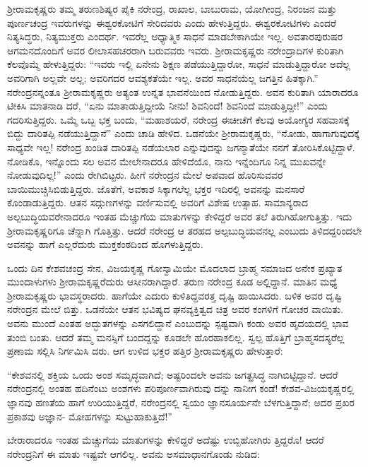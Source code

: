 ಶ್ರೀರಾಮಕೃಷ್ಣರು ತಮ್ಮ ತರುಣಶಿಷ್ಯರ ಪೈಕಿ ನರೇಂದ್ರ, ರಾಖಾಲ, ಬಾಬುರಾಮ, ಯೋಗೀಂದ್ರ, ನಿರಂಜನ ಮತ್ತು ಪೂರ್ಣಚಂದ್ರ ಇವರುಗಳನ್ನು ಈಶ್ವರಕೋಟಿಗೆ ಸೇರಿದವರು ಎಂದು ಹೇಳುತ್ತಿದ್ದರು. ಈಶ್ವರಕೋಟಿಗಳು ಎಂದರೆ ನಿತ್ಯಸಿದ್ಧರು, ನಿತ್ಯಮುಕ್ತರು ಎಂದರ್ಥ. ಇವರೆಲ್ಲ ಆಧ್ಯಾತ್ಮಿಕ ಸಾಧನೆ ಮಾಡಬೇಕಾಗಿಯೇ ಇಲ್ಲ. ಅವತಾರಪುರುಷರ ಆಗಮನದೊಂದಿಗೆ ಅವರ ಲೀಲಾಸಹಚರರಾಗಿ ಬರುವವರು ಇವರು. ಶ್ರೀರಾಮಕೃಷ್ಣರು ನರೇಂದ್ರಾದಿಗಳ ಕುರಿತಾಗಿ ಕೆಲವೊಮ್ಮೆ ಹೇಳುತ್ತಿದ್ದರು: “ಇವರು ಇಲ್ಲಿ ಏನೇನು ಶಿಕ್ಷಣ ಪಡೆಯುತ್ತಿದ್ದಾರೋ, ಸಾಧನೆ ಮಾಡುತ್ತಿದ್ದಾರೋ ಅದೆಲ್ಲ ಅವರಿಗಾಗಿ ಅಲ್ಲವೇ ಅಲ್ಲ; ಅವರಿಗದರ ಆವಶ್ಯಕತೆಯೇ ಇಲ್ಲ. ಅವರ ಸಾಧನೆಯೆಲ್ಲ ಜಗತ್ತಿನ ಹಿತಕ್ಕಾಗಿ.” ನರೇಂದ್ರನನ್ನಂತೂ ಶ್ರೀರಾಮಕೃಷ್ಣರು ಅತ್ಯಂತ ಉನ್ನತ ಭಾವನೆಯಿಂದ ನೋಡುತ್ತಿದ್ದರು. ಅವನ ಕುರಿತಾಗಿ ಯಾರಾದರೂ ಟೀಕಿಸಿ ಮಾತನಾಡಿ ದರೆ, “ಏನು ಮಾತಾಡುತ್ತಿದ್ದೀಯೆ ನೀನು! ಶಿವನಿಂದೆ! ಶಿವನಿಂದೆ ಮಾಡುತ್ತಿದ್ದೀ!” ಎಂದು ಗದರಿಸುತ್ತಿದ್ದರು. ಒಮ್ಮೆ ಒಬ್ಬ ಭಕ್ತ ಬಂದು, “ಮಹಾಶಯರೆ, ನರೇಂದ್ರ ಈಚೀಚೆಗೆ ಕೆಲವು ಅಯೋಗ್ಯರ ಸಹವಾಸಕ್ಕೆ ಬಿದ್ದು ದಾರಿತಪ್ಪಿ ನಡೆಯುತ್ತಿದ್ದಾನೆ” ಎಂದು ಚಾಡಿ ಹೇಳಿದ. ಒಡನೆಯೇ ಶ್ರೀರಾಮಕೃಷ್ಣರು, “ನೋಡು, ಹಾಗಾಗುವುದಕ್ಕೆ ಸಾಧ್ಯವೇ ಇಲ್ಲ! ನರೇಂದ್ರ ಖಂಡಿತ ದಾರಿತಪ್ಪಿ ನಡೆಯಲಾರ ಎನ್ನುವುದನ್ನು ಜಗನ್ಮಾತೆಯೇ ನನಗೆ ತೋರಿಸಿಕೊಟ್ಟಿದ್ದಾಳೆ. ನೋಡಿಕೊ, ಇನ್ನೊಂದು ಸಲ ಅವನ ಮೇಲೇನಾದರೂ ಹೇಳಿದೆಯೊ, ನಾನು ಇನ್ನೆಂದಿಗೂ ನಿನ್ನ ಮುಖವನ್ನೇ ನೋಡುವುದಿಲ್ಲ!” ಎಂದು ರೇಗಿಬಿಟ್ಟರು. ಹೀಗೆ ನರೇಂದ್ರನ ಮೇಲೆ ಅಪವಾದ ಹೊರಿಸುವವರ ಬಾಯಿಮುಚ್ಚಿಸಿಬಿಡುತ್ತಿದ್ದರು. ಜೊತೆಗೆ, ಅವಕಾಶ ಸಿಕ್ಕಾಗಲೆಲ್ಲ ಭಕ್ತರ ಇದಿರಲ್ಲಿ ಅವನನ್ನು ಮನಸಾರೆ ಕೊಂಡಾಡುತ್ತಿದ್ದರು. ಆತನ ಸದ್ಗುಣಗಳನ್ನು ವರ್ಣಿಸುವಲ್ಲಿ ಅವರಿಗೆ ವಿಶೇಷ ಉತ್ಸಾಹ. ಸಾಮಾನ್ಯರಾದ ಅಲ್ಪಬುದ್ಧಿಯವರೇನಾದರೂ ಇಂತಹ ಮೆಚ್ಚುಗೆಯ ಮಾತುಗಳನ್ನು ಕೇಳಿದ್ದರೆ ಅವರ ತಲೆ ತಿರುಗಿಹೋಗುತ್ತಿತ್ತು. ಇದು ಶ್ರೀರಾಮಕೃಷ್ಣರಿಗೂ ಚೆನ್ನಾಗಿ ಗೊತ್ತಿತ್ತು. ಆದರೆ ನರೇಂದ್ರ ಆ ತರಹದ ಅಲ್ಪಬುದ್ಧಿಯವನಲ್ಲ ಎಂಬುದು ತಿಳಿದದ್ದರಿಂದಲೇ ಅವನನ್ನು ಹಾಗೆ ಎಲ್ಲರೆದುರು ಮುಕ್ತಕಂಠದಿಂದ ಹೊಗಳುತ್ತಿದ್ದರು.

ಒಂದು ದಿನ ಕೇಶವಚಂದ್ರ ಸೇನ, ವಿಜಯಕೃಷ್ಣ ಗೋಸ್ವಾಮಿಯೇ ಮೊದಲಾದ ಬ್ರಾಹ್ಮ ಸಮಾಜದ ಅನೇಕ ಪ್ರಖ್ಯಾತ ಮುಂದಾಳುಗಳು ಶ್ರೀರಾಮಕೃಷ್ಣರೆದುರು ಆಸೀನರಾಗಿದ್ದಾರೆ. ತರುಣ ನರೇಂದ್ರ ಕೂಡ ಅಲ್ಲಿದ್ದಾನೆ. ಮಾತಿನ ಮಧ್ಯೆ ಶ್ರೀರಾಮಕೃಷ್ಣರು ಭಾವಸ್ಥರಾದರು. ಹಾಗೆಯೇ ಎದುರು ಕುಳಿತಿದ್ದವರತ್ತ ದೃಷ್ಟಿ ಹಾಯಿಸಿದರು. ಬಳಿಕ ಅವರ ದೃಷ್ಟಿ ನರೇಂದ್ರನ ಮೇಲೆ ಬಿತ್ತು. ಒಡನೆಯೇ ಆತನ ಭವಿಷ್ಯದ ಘನವ್ಯಕ್ತಿತ್ವದ ಚಿತ್ರ ಅವರ ಕಂಗಳಿಗೆ ಗೋಚರ ವಾಯಿತು. ಅವನು ಮುಂದೆ ಎಂತಹ ಅದ್ಭುತಗಳನ್ನು ಎಸಗಲಿದ್ದಾನೆ ಎಂಬುದನ್ನು ಸ್ಪಷ್ಟವಾಗಿ ಕಂಡು ಅವರ ಹೃದಯದಲ್ಲಿ ಭಾವ ತುಂಬಿ ಬಂತು. ಆದರೆ ತಮ್ಮ ಮನಸ್ಸಿಗೆ ಬಂದದ್ದನ್ನು ಕೂಡಲೇ ಹೊರಹಾಕಲಿಲ್ಲ. ಸ್ವಲ್ಪ ಹೊತ್ತಿಗೆ ಬ್ರಾಹ್ಮಸದಸ್ಯರೆಲ್ಲ ಪ್ರಣಾಮ ಸಲ್ಲಿಸಿ ನಿರ್ಗಮಿಸಿ ದರು. ಆಗ ಉಳಿದ ಭಕ್ತರ ಹತ್ತಿರ ಶ್ರೀರಾಮಕೃಷ್ಣರು ಹೇಳುತ್ತಾರೆ:

“ಕೇಶವನಲ್ಲಿ ಶಕ್ತಿಯ ಒಂದು ಅಂಶ ಸಮೃದ್ಧವಾಗಿದೆ; ಅಷ್ಟರಿಂದಲೇ ಅವನು ಜಗತ್ಪ್ರಸಿದ್ಧ ನಾಗಿಬಿಟ್ಟಿದ್ದಾನೆ. ಆದರೆ ನರೇಂದ್ರನಲ್ಲಿ ಅಂತಹ ಹದಿನೆಂಟು ಅಂಶಗಳು ಪರಿಪೂರ್ಣವಾಗಿರುವು ದನ್ನು ನಾನೀಗ ಕಂಡೆ! ಕೇಶವ-ವಿಜಯಕೃಷ್ಣರಲ್ಲಿ ಜ್ಞಾನವು ಹಣತೆಯ ಹಾಗೆ ಉರಿಯುತ್ತಿದ್ದರೆ, ನರೇಂದ್ರನಲ್ಲಿ ಸ್ವಯಂ ಜ್ಞಾನಸೂರ್ಯನೇ ಬೆಳಗುತ್ತಿದ್ದಾನೆ; ಅದರ ಪ್ರಖರ ಪ್ರಕಾಶವು ಅಜ್ಞಾನ- ಮೋಹಗಳನ್ನು ಸುಟ್ಟುಹಾಕುತ್ತಿದೆ!”

ಬೇರಾರಾದರೂ ಇಂತಹ ಮೆಚ್ಚುಗೆಯ ಮಾತುಗಳನ್ನು ಕೇಳಿದ್ದರೆ ಅದೆಷ್ಟು ಉಬ್ಬಿಹೋಗಿರು ತ್ತಿದ್ದರೊ! ಆದರೆ ನರೇಂದ್ರನಿಗೆ ಈ ಮಾತು ಇಷ್ಟವೇ ಆಗಲಿಲ್ಲ. ಅವನು ಅಸಮಾಧಾನಗೊಂಡು ನುಡಿದ:

